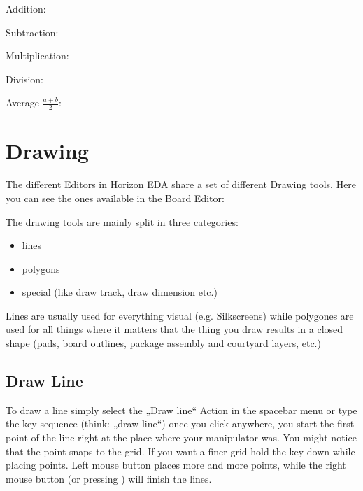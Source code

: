 \documentclass[letterpaper,10pt,czech]{sphinxmanual}
\begin{document}
Addition: 

Subtraction: 

Multiplication: 

Division: 

Average \(\frac{ a+b }{2}\): 


\chapter{Drawing}
\label{\detokenize{drawing:drawing}}\label{\detokenize{drawing::doc}}
The different Editors in Horizon EDA share a set of different Drawing tools. Here you can see the ones available in the Board Editor:

\noindent{}

The drawing tools are mainly split in three categories:
\begin{itemize}
\item {} 
lines

\item {} 
polygons

\item {} 
special (like draw track, draw dimension etc.)

\end{itemize}

Lines are usually used for everything visual (e.g. Silkscreens) while polygones are used for all things where it matters that the thing you draw results in a closed shape (pads, board outlines, package assembly and courtyard layers, etc.)


\section{Draw Line}
\label{\detokenize{drawing:draw-line}}
\noindent{}

To draw a line simply select the „Draw line“ Action in the spacebar menu or type the key sequence  (think: „draw line“) \textendash{} once you click anywhere, you start the first point of the line right at the place where your manipulator was. You might notice that the point snaps to the grid. If you want a finer grid hold the  key down while placing points. Left mouse button places more and more points, while the right mouse button (or pressing ) will finish the lines.
\end{document}
